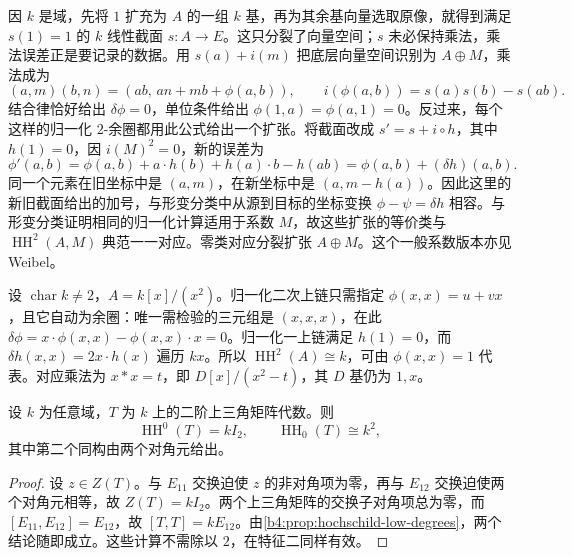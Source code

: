 \ProseParagraphBreak
因 \(k\) 是域，先将 \(1\) 扩充为 \(A\) 的一组 \(k\) 基，再为其余基向量选取原像，就得到满足 \(s(1)=1\) 的 \(k\) 线性截面 \(s:A\to E\)。这只分裂了向量空间；\(s\) 未必保持乘法，乘法误差正是要记录的数据。用 \(s(a)+i(m)\) 把底层向量空间识别为 \(A\oplus M\)，乘法成为
\[
	(a,m)(b,n)=(ab,\,an+mb+\phi(a,b)), \qquad i(\phi(a,b))=s(a)s(b)-s(ab).
\]
结合律恰好给出 \(\delta\phi=0\)，单位条件给出 \(\phi(1,a)=\phi(a,1)=0\)。反过来，每个这样的归一化 \(2\)-余圈都用此公式给出一个扩张。将截面改成 \(s'=s+i\circ h\)，其中 \(h(1)=0\)，因 \(i(M)^2=0\)，新的误差为
\[
	\phi'(a,b)=\phi(a,b)+a\cdot h(b)+h(a)\cdot b-h(ab) =\phi(a,b)+(\delta h)(a,b).
\]
同一个元素在旧坐标中是 \((a,m)\)，在新坐标中是 \((a,m-h(a))\)。因此这里的新旧截面给出的加号，与形变分类中从源到目标的坐标变换 \(\phi-\psi=\delta h\) 相容。与形变分类证明相同的归一化计算适用于系数 \(M\)，故这些扩张的等价类与 \(\operatorname{HH}^2(A,M)\) 典范一一对应。零类对应分裂扩张 \(A\oplus M\)。这个一般系数版本亦见 Weibel\cite[Classification Theorem 9.3.1]{Weibel1994HomologicalAlgebra}。

\begin{example}\label{b4:exm:dual-numbers-first-deformation}
	设 \(\operatorname{char}k\ne2\)，\(A=k[x]/(x^2)\)。归一化二次上链只需指定 \(\phi(x,x)=u+vx\)，且它自动为余圈：唯一需检验的三元组是 \((x,x,x)\)，在此 \(\delta\phi=x\cdot\phi(x,x)-\phi(x,x)\cdot x=0\)。归一化一上链满足 \(h(1)=0\)，而 \(\delta h(x,x)=2x\cdot h(x)\) 遍历 \(kx\)。所以 \(\operatorname{HH}^2(A)\cong k\)，可由 \(\phi(x,x)=1\) 代表。对应乘法为 \(x*x=t\)，即 \(D[x]/(x^2-t)\)，其 \(D\) 基仍为 \(1,x\)。
\end{example}

\begin{proposition}\label{b4:prop:upper-triangular-low-hh}
	设 \(k\) 为任意域，\(T\) 为 \(k\) 上的二阶上三角矩阵代数。则
	\[
		\operatorname{HH}^0(T)=kI_2,\qquad \operatorname{HH}_0(T)\cong k^2,
	\]
	其中第二个同构由两个对角元给出。
\end{proposition}
\begin{proof}
	设 \(z\in Z(T)\)。与 \(E_{11}\) 交换迫使 \(z\) 的非对角项为零，再与 \(E_{12}\) 交换迫使两个对角元相等，故 \(Z(T)=kI_2\)。两个上三角矩阵的交换子对角项总为零，而 \([E_{11},E_{12}]=E_{12}\)，故 \([T,T]=kE_{12}\)。由\cref{b4:prop:hochschild-low-degrees}，两个结论随即成立。这些计算不需除以 \(2\)，在特征二同样有效。
\end{proof}
